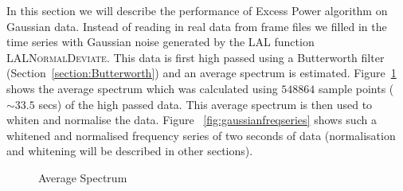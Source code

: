 \documentclass{article}
\begin{document}
In this section we will describe the performance of Excess Power algorithm  
on Gaussian data.  Instead of reading in real data from frame files we
filled in the time series with Gaussian noise generated by the LAL function
\textsc{LALNormalDeviate}.  This data is first high passed using a
Butterworth filter (Section~\ref{section:Butterworth}) and an average
spectrum is estimated.  Figure~\ref{fig:gaussianspectrum} shows the average
spectrum which was calculated using $548864$ sample points ($\sim 33.5$
secs) of the high passed data.  This average spectrum is then used to
whiten and normalise the data.   Figure ~\ref{fig:gaussianfreqseries} shows
such a whitened and normalised frequency series of two seconds of data
(normalisation and whitening will be described in other sections).
\begin{figure}
\begin{center}
\caption{Average Spectrum}
\label{fig:gaussianspectrum}
\end{center}
\end{figure}
\end{document}
